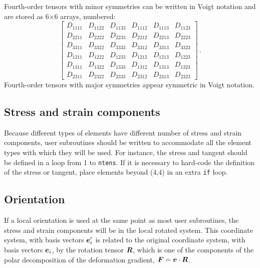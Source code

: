 \documentclass[10pt,letterpaper,oneside]{report}
\newcommand{\ten}[1]{\mbox{\boldmath $#1$}{}}
\begin{document}
Fourth-order tensors with minor symmetries can be written in Voigt notation and are stored as 6$\times$6 arrays, numbered: 
\begin{equation}\begin{bmatrix}
D_{1111} & D_{1122} & D_{1133} & D_{1112} & D_{1113} & D_{1123} \\
D_{2211} & D_{2222} & D_{2233} & D_{2212} & D_{2213} & D_{2223} \\
D_{3311} & D_{3322} & D_{3333} & D_{3312} & D_{3313} & D_{3323} \\
D_{1211} & D_{1222} & D_{1233} & D_{1212} & D_{1213} & D_{1223} \\
D_{1311} & D_{1322} & D_{1333} & D_{1312} & D_{1313} & D_{1323} \\
D_{2311} & D_{2322} & D_{2333} & D_{2312} & D_{2313} & D_{2323}
\end{bmatrix} \, . \end{equation}
Fourth-order tensors with major symmetries appear symmetric in Voigt notation.


\subsection{Stress and strain components}
Because different types of elements have different number of stress and strain components, user subroutines should be written to accommodate all the element types with which they will be used.  For instance, the stress and tangent should be defined in a loop from 1 to \texttt{ntens}.  If it is necessary to hard-code the definition of the stress or tangent, place elements beyond (4,4) in an extra \texttt{if} loop.  


\subsection{Orientation}
\label{subsec:orientation}

If a local orientation is used at the same point as most user subroutines, the stress and strain components will be in the local rotated system.  This coordinate system, with basis vectors $\ten{e}'_i$ is related to the original coordinate system, with basis vectors $\ten{e}_i$, by the rotation tensor $\ten{R}$, which is one of the components of the polar decomposition of the deformation gradient, $\ten{F} = \ten{v} \cdot \ten{R}$.  
\end{document}
